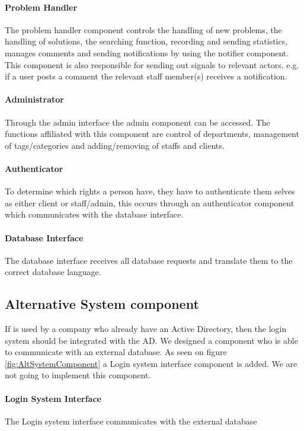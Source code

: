 \paragraph{Problem Handler}
The problem handler component controls the handling of new problems, the handling of solutions, the searching function, recording and sending statistics, manages comments and sending notifications by using the notifier component.
This component is also responsible for sending out signals to relevant actors. e.g. if a user posts a comment the relevant staff member(s) receives a notification.  

\paragraph{Administrator}
Through the admin interface the admin component can be accessed. The functions affiliated with this component are control of departments, management of tags/categories and adding/removing of staffs and clients.   

\paragraph{Authenticator}
To determine which rights a person have, they have to authenticate them selves as either client or staff/admin, this occurs through an authenticator component which communicates with the database interface. 
\paragraph{Database Interface}
The database interface receives all database requests and translate them to the correct database language.


\subsection{Alternative System component}
\label{sub:altSystemComponent}
 
If \hdesk is used by a company who already have an Active Directory, then the login system should be integrated with the AD. We designed a component who is able to communicate with an external database. As seen on figure \ref{fig:AltSystemComponent} a Login system interface component is added. We are not going to implement this component.

\paragraph{Login System Interface}
The Login system interface communicates with the external database



